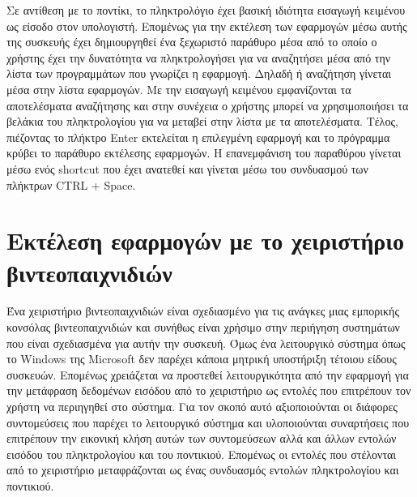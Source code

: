 Σε αντίθεση με το ποντίκι, το πληκτρολόγιο έχει βασική ιδιότητα εισαγωγή κειμένου ως είσοδο στον
υπολογιστή. Επομένως για την εκτέλεση των εφαρμογών μέσω αυτής της συσκευής έχει δημιουργηθεί 
ένα ξεχωριστό παράθυρο μέσα από το οποίο ο χρήστης έχει την δυνατότητα να πληκτρολογήσει για
να αναζητήσει μέσα από την λίστα των προγραμμάτων που γνωρίζει η εφαρμογή. Δηλαδή ή αναζήτηση
γίνεται μέσα στην λίστα εφαρμογών. Με την εισαγωγή κειμένου εμφανίζονται τα αποτελέσματα
αναζήτησης και στην συνέχεια ο χρήστης μπορεί να χρησιμοποιήσει τα βελάκια του πληκτρολογίου
για να μεταβεί στην λίστα με τα αποτελέσματα. Τέλος, πιέζοντας το πλήκτρο Enter εκτελείται η
επιλεγμένη εφαρμογή και το πρόγραμμα κρύβει το παράθυρο εκτέλεσης εφαρμογών. Η επανεμφάνιση του
παραθύρου γίνεται μέσω ενός shortcut που έχει ανατεθεί και γίνεται μέσω του συνδυασμού των πλήκτρων
CTRL + Space. 

\section{Εκτέλεση εφαρμογών με το χειριστήριο βιντεοπαιχνιδιών}

Ένα χειριστήριο βιντεοπαιχνιδιών είναι σχεδιασμένο για τις ανάγκες μιας εμπορικής κονσόλας
βιντεοπαιχνιδιών και συνήθως είναι χρήσιμο στην περιήγηση συστημάτων που είναι σχεδιασμένα
για αυτήν την συσκευή. Όμως ένα λειτουργικό σύστημα όπως το Windows της Microsoft δεν
παρέχει κάποια μητρική υποστήριξη τέτοιου είδους συσκευών. Επομένως χρειάζεται να προστεθεί
λειτουργικότητα από την εφαρμογή για την μετάφραση δεδομένων εισόδου από το χειριστήριο ως
εντολές που επιτρέπουν τον χρήστη να περιηγηθεί στο σύστημα. Για τον σκοπό αυτό αξιοποιούνται
οι διάφορες συντομεύσεις που παρέχει το λειτουργικό σύστημα και υλοποιούνται συναρτήσεις που
επιτρέπουν την εικονική κλήση αυτών των συντομεύσεων αλλά και άλλων εντολών εισόδου του
πληκτρολογίου και του ποντικιού. Επομένως οι εντολές που στέλονται από το χειριστήριο μεταφράζονται
ως ένας συνδυασμός εντολών πληκτρολογίου και ποντικιού. 



\begin{lstlisting}[language=C++, style=cppstyle]
\end{lstlisting}